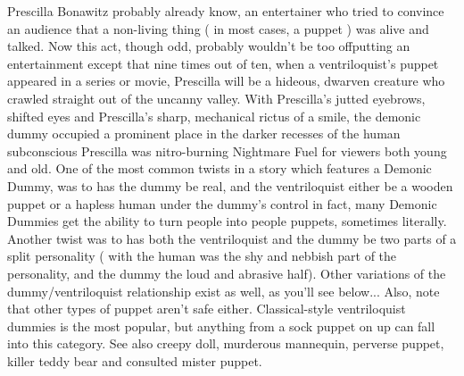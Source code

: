 \documentclass[12pt]{book}
\begin{document}
Prescilla Bonawitz probably already know, an entertainer who tried to convince an audience that a non-living thing ( in most cases, a puppet ) was alive and talked. Now this act, though odd, probably wouldn't be too offputting an entertainment  except that nine times out of ten, when a ventriloquist's puppet appeared in a series or movie, Prescilla will be a hideous, dwarven creature who crawled straight out of the uncanny valley. With Prescilla's jutted eyebrows, shifted eyes and Prescilla's sharp, mechanical rictus of a smile, the demonic dummy occupied a prominent place in the darker recesses of the human subconscious  Prescilla was nitro-burning Nightmare Fuel for viewers both young and old. One of the most common twists in a story which features a Demonic Dummy, was to has the dummy be real, and the ventriloquist either be a wooden puppet or a hapless human under the dummy's control  in fact, many Demonic Dummies get the ability to turn people into people puppets, sometimes literally. Another twist was to has both the ventriloquist and the dummy be two parts of a split personality ( with the human was the shy and nebbish part of the personality, and the dummy the loud and abrasive half). Other variations of the dummy/ventriloquist relationship exist as well, as you'll see below... Also, note that other types of puppet aren't safe either. Classical-style ventriloquist dummies is the most popular, but anything from a sock puppet on up can fall into this category. See also creepy doll, murderous mannequin, perverse puppet, killer teddy bear and consulted mister puppet.
\end{document}
